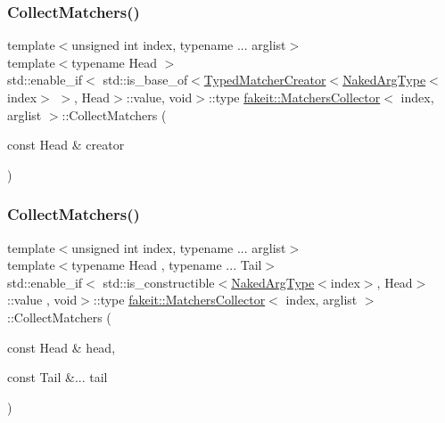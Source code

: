 \mbox{\label{classfakeit_1_1MatchersCollector_ae954aa74286bcd096169067f5e897356}} 
\subsubsection{\texorpdfstring{CollectMatchers()}{CollectMatchers()}\hspace{0.1cm}{\footnotesize\ttfamily [17/63]}}
{\footnotesize\ttfamily template$<$unsigned int index, typename ... arglist$>$ \\
template$<$typename Head $>$ \\
std\+::enable\+\_\+if$<$ std\+::is\+\_\+base\+\_\+of$<$\mbox{\hyperlink{structfakeit_1_1TypedMatcherCreator}{Typed\+Matcher\+Creator}}$<$\mbox{\hyperlink{classfakeit_1_1MatchersCollector_aeda8ced6a2f0cb7c6e4f916f18a91730}{Naked\+Arg\+Type}}$<$index$>$ $>$, Head$>$\+::value, void$>$\+::type \mbox{\hyperlink{classfakeit_1_1MatchersCollector}{fakeit\+::\+Matchers\+Collector}}$<$ index, arglist $>$\+::Collect\+Matchers (\begin{DoxyParamCaption}\item[{const Head \&}]{creator }\end{DoxyParamCaption})\hspace{0.3cm}{\ttfamily [inline]}}

\mbox{\label{classfakeit_1_1MatchersCollector_a29c5245d03b8fab3773455c087edde74}} 
\subsubsection{\texorpdfstring{CollectMatchers()}{CollectMatchers()}\hspace{0.1cm}{\footnotesize\ttfamily [18/63]}}
{\footnotesize\ttfamily template$<$unsigned int index, typename ... arglist$>$ \\
template$<$typename Head , typename ... Tail$>$ \\
std\+::enable\+\_\+if$<$ std\+::is\+\_\+constructible$<$\mbox{\hyperlink{classfakeit_1_1MatchersCollector_aeda8ced6a2f0cb7c6e4f916f18a91730}{Naked\+Arg\+Type}}$<$index$>$, Head$>$\+::value , void$>$\+::type \mbox{\hyperlink{classfakeit_1_1MatchersCollector}{fakeit\+::\+Matchers\+Collector}}$<$ index, arglist $>$\+::Collect\+Matchers (\begin{DoxyParamCaption}\item[{const Head \&}]{head,  }\item[{const Tail \&...}]{tail }\end{DoxyParamCaption})\hspace{0.3cm}{\ttfamily [inline]}}

